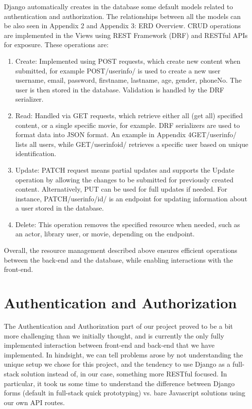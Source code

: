 \documentclass[letterpaper,twocolumn]{article}
\begin{document}
Django automatically creates in the database some default models related to authentication and authorization. The relationships between all the models can be also seen in Appendix 2 and Appendix 3: ERD Overview. CRUD operations are implemented in the Views using REST Framework (DRF) and RESTful APIs for exposure. These operations are: 

\begin{enumerate}
    \item Create: Implemented using POST requests, which create new content when submitted, for example POST/userinfo/ is used to create a new user {username, email, password, firstname, lastname, age, gender, phoneNo}. The user is then stored in the database. Validation is handled by the DRF serializer. 

    \item Read: Handled via GET requests, which retrieve either all (get all) specified content, or a single specific movie, for example. DRF serializers are used to format data into JSON format. An example in Appendix 4GET/userinfo/ lists all users, while GET/userinfo{id}/ retrieves a specific user based on unique identification.

    \item Update: PATCH request means partial updates and supports the Update operation by allowing the changes to be submitted for previously created content. Alternatively, PUT can be used for full updates if needed. For instance, PATCH/userinfo/{id}/ is an endpoint for updating information about a user stored in the database. 

    \item Delete: This operation removes the specified resource when needed, such as an actor, library user, or movie, depending on the endpoint. 

\end{enumerate}

Overall, the resource management described above ensures efficient operations between the back-end and the database, while enabling interactions with the front-end. 

\section{Authentication and Authorization}

The Authentication and Authorization part of our project proved to be a bit more challenging than we initially thought, and is currently the only fully implemented interaction between front-end and back-end that we have implemented. In hindsight, we can tell problems arose by not understanding the unique setup we chose for this project, and the tendency to use Django as a full-stack solution instead of, in our case, something more RESTful focused. In particular, it took us some time to understand the difference between Django forms (default in full-stack quick prototyping) vs. bare Javascript solutions using our own API routes.
\end{document}
